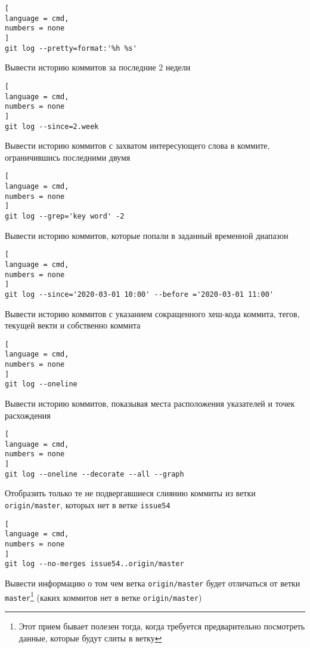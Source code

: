 \documentclass[%
	11pt,
	a4paper,
	utf8,
		]{article}
\begin{document}
\begin{lstlisting}[
language = cmd,
numbers = none
]
git log --pretty=format:'%h %s'
\end{lstlisting}


Вывести историю коммитов за последние 2 недели

\begin{lstlisting}[
language = cmd,
numbers = none
]
git log --since=2.week
\end{lstlisting}


Вывести историю коммитов с захватом интересующего слова в коммите, ограничившись последними двумя

\begin{lstlisting}[
language = cmd,
numbers = none
]
git log --grep='key word' -2
\end{lstlisting}


Вывести историю коммитов, которые попали в заданный временной диапазон

\begin{lstlisting}[
language = cmd,
numbers = none
]
git log --since='2020-03-01 10:00' --before ='2020-03-01 11:00'
\end{lstlisting}


Вывести историю коммитов с указанием сокращенного хеш-кода коммита, тегов, текущей векти и собственно коммита

\begin{lstlisting}[
language = cmd,
numbers = none
]
git log --oneline
\end{lstlisting}


Вывести историю коммитов, показывая места расположения указателей и точек расхождения

\begin{lstlisting}[
language = cmd,
numbers = none
]
git log --oneline --decorate --all --graph
\end{lstlisting}

Отобразить только те не подвергавшиеся слиянию коммиты из ветки \texttt{origin/master}, которых нет в ветке \texttt{issue54}

\begin{lstlisting}[
language = cmd,
numbers = none
]
git log --no-merges issue54..origin/master
\end{lstlisting}

Вывести информацию о том чем ветка \texttt{origin/master} будет отличаться от ветки \texttt{master}\footnote{Этот прием бывает полезен тогда, когда требуется предварительно посмотреть данные, которые будут слиты в ветку} (каких коммитов нет в ветке \texttt{origin/master})
\end{document}

